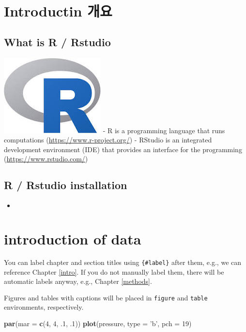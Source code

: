 \documentclass[]{book}
\newenvironment{Shaded}{\begin{snugshade}}{\end{snugshade}}
\newcommand{\KeywordTok}[1]{\textcolor[rgb]{0.13,0.29,0.53}{\textbf{#1}}}
\newcommand{\DataTypeTok}[1]{\textcolor[rgb]{0.13,0.29,0.53}{#1}}
\newcommand{\DecValTok}[1]{\textcolor[rgb]{0.00,0.00,0.81}{#1}}
\newcommand{\FloatTok}[1]{\textcolor[rgb]{0.00,0.00,0.81}{#1}}
\newcommand{\StringTok}[1]{\textcolor[rgb]{0.31,0.60,0.02}{#1}}
\newcommand{\NormalTok}[1]{#1}
\begin{document}
\hypertarget{introductin-}{%
\chapter{Introductin 개요}\label{introductin-}}

\hypertarget{what-is-r-rstudio}{%
\section{What is R / Rstudio}\label{what-is-r-rstudio}}

\includegraphics{images/r.jpg}
- R is a programming language that runs computations (\url{https://www.r-project.org/})
- RStudio is an integrated development environment (IDE) that provides an interface for the programming (\url{https://www.rstudio.com/})

\hypertarget{r-rstudio-installation}{%
\section{R / Rstudio installation}\label{r-rstudio-installation}}

\begin{itemize}
\item
\end{itemize}

\hypertarget{introduction-of-data}{%
\chapter{introduction of data}\label{introduction-of-data}}

You can label chapter and section titles using \texttt{\{\#label\}} after them, e.g., we can reference Chapter \ref{intro}. If you do not manually label them, there will be automatic labels anyway, e.g., Chapter \ref{methods}.

Figures and tables with captions will be placed in \texttt{figure} and \texttt{table} environments, respectively.

\begin{Shaded}
\begin{Highlighting}[]
\KeywordTok{par}\NormalTok{(}\DataTypeTok{mar =} \KeywordTok{c}\NormalTok{(}\DecValTok{4}\NormalTok{, }\DecValTok{4}\NormalTok{, }\FloatTok{.1}\NormalTok{, }\FloatTok{.1}\NormalTok{))}
\KeywordTok{plot}\NormalTok{(pressure, }\DataTypeTok{type =} \StringTok{'b'}\NormalTok{, }\DataTypeTok{pch =} \DecValTok{19}\NormalTok{)}
\end{Highlighting}
\end{Shaded}
\end{document}
